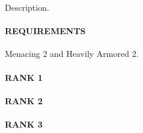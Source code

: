 \normalsize
Description.
\paragraph{REQUIREMENTS} Menacing 2 and Heavily Armored 2.
\paragraph{RANK 1}
\paragraph{RANK 2}
\paragraph{RANK 3}




